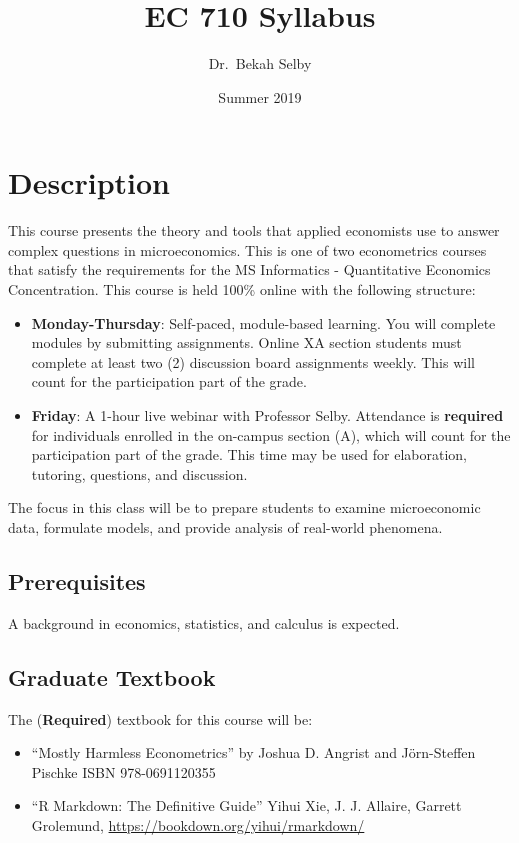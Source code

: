\documentclass[]{tufte-handout}
\title{EC 710 Syllabus}
\author{Dr.~Bekah Selby}
\date{Summer 2019}
\providecommand{\tightlist}{%
  \setlength{\itemsep}{0pt}\setlength{\parskip}{0pt}}
\begin{document}
\maketitle




\hypertarget{description}{%
\section{Description}\label{description}}

This course presents the theory and tools that applied economists use to
answer complex questions in microeconomics. This is one of two
econometrics courses that satisfy the requirements for the MS
Informatics - Quantitative Economics Concentration. This course is held
100\% online with the following structure:

\begin{itemize}
\tightlist
\item
  \textbf{Monday-Thursday}: Self-paced, module-based learning. You will
  complete modules by submitting assignments. Online XA section students
  must complete at least two (2) discussion board assignments weekly.
  This will count for the participation part of the grade.
\item
  \textbf{Friday}: A 1-hour live webinar with Professor Selby.
  Attendance is \textbf{required} for individuals enrolled in the
  on-campus section (A), which will count for the participation part of
  the grade. This time may be used for elaboration, tutoring, questions,
  and discussion.
\end{itemize}

\noindent The focus in this class will be to prepare students to examine
microeconomic data, formulate models, and provide analysis of real-world
phenomena.

\subsection*{Prerequisites}

A background in economics, statistics, and calculus is expected.

\subsection*{Graduate Textbook}

The (\textbf{Required}) textbook for this course will be:

\begin{itemize}
    \item ``Mostly Harmless Econometrics'' by Joshua D. Angrist and J{\"o}rn-Steffen Pischke
    ISBN 978-0691120355
    \item ``R Markdown: The Definitive Guide'' Yihui Xie, J. J. Allaire, Garrett Grolemund, \url{https://bookdown.org/yihui/rmarkdown/}
\end{itemize}
\end{document}
